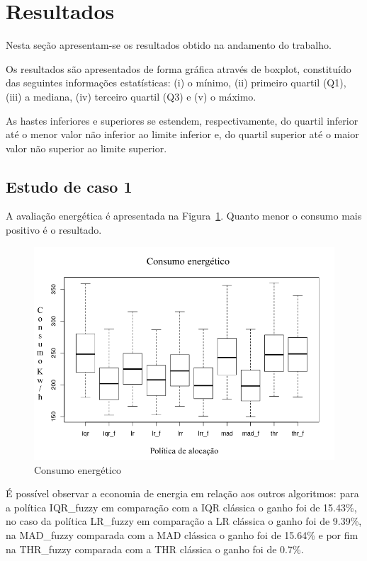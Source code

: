 \documentclass[tcc,capa]{texufpel}
\begin{document}
\section{Resultados} \label{secResultados}

Nesta seção apresentam-se os resultados obtido na andamento do trabalho. 

Os resultados são apresentados de forma gráfica através de boxplot, constituído das seguintes informações estatísticas: (i) o mínimo, (ii) primeiro quartil (Q1), (iii) a mediana, (iv) terceiro quartil (Q3) e (v) o máximo. 

As hastes inferiores e superiores se estendem, respectivamente, do quartil inferior até o menor valor não inferior ao limite inferior e, do quartil superior até o maior valor não superior ao limite superior.

\newpage

\subsection{Estudo de caso 1}

A avaliação energética é apresentada na Figura~\ref{fig:avaliacao_energetica}. Quanto menor o consumo mais positivo é o resultado. 

\begin{figure}[h]
\centering
\includegraphics[scale=0.55]{images/resultados/energia_geral_pt.png} %
\caption{Consumo energético}
\label{fig:avaliacao_energetica}
\end{figure}

É possível observar a economia de energia em relação aos outros algoritmos:  para a política IQR\_fuzzy em comparação com a IQR clássica o ganho foi de 15.43\%, no caso da política LR\_fuzzy em comparação a LR clássica o ganho foi de 9.39\%, na MAD\_fuzzy comparada com a MAD clássica o ganho foi de 15.64\% e por fim na THR\_fuzzy comparada com a THR clássica o ganho foi de 0.7\%.
\end{document}
